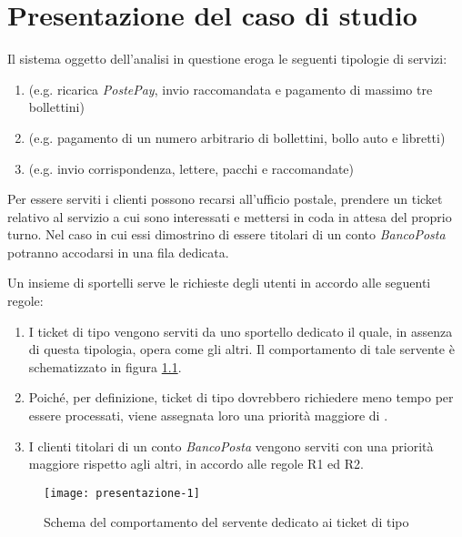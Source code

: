 \chapter{Presentazione del caso di studio}\label{chp:presentazione}
Il sistema oggetto dell'analisi in questione eroga le seguenti tipologie di servizi:
\begin{enumerate}
\item \uo{} (e.g. ricarica \textsl{PostePay}, invio raccomandata e pagamento di massimo tre bollettini)
\item \pp{} (e.g. pagamento di un numero arbitrario di bollettini, bollo auto e libretti)  
\item \sr{} (e.g. invio corrispondenza, lettere, pacchi e raccomandate)
\end{enumerate}

Per essere serviti i clienti possono recarsi all'ufficio postale, prendere un ticket relativo al servizio a cui sono interessati e mettersi in coda in attesa del proprio turno. Nel caso in cui essi dimostrino di essere titolari di un conto \textsl{BancoPosta} potranno accodarsi in una fila dedicata.

Un insieme di sportelli serve le richieste degli utenti in accordo alle seguenti regole: 
\begin{enumerate}[label=R\arabic*), align=left, leftmargin=*]
\item I ticket di tipo \sr{} vengono serviti da uno sportello dedicato il quale, in assenza di questa tipologia, opera come gli altri. Il comportamento di tale servente è schematizzato in figura \ref{fig:presentazione-1}. 
\item Poiché, per definizione, ticket di tipo \uo{} dovrebbero richiedere meno tempo per essere processati, viene assegnata loro una priorità maggiore di \pp{}.
\item I clienti titolari di un conto \textsl{BancoPosta} vengono serviti con una priorità maggiore rispetto agli altri, in accordo alle regole R1 ed R2.
\end{enumerate}

\begin{figure}[ht]
\centering
\texttt{[image: presentazione-1]}
\caption{Schema del comportamento del servente dedicato ai ticket di tipo \sr}
\label{fig:presentazione-1}
\end{figure}
